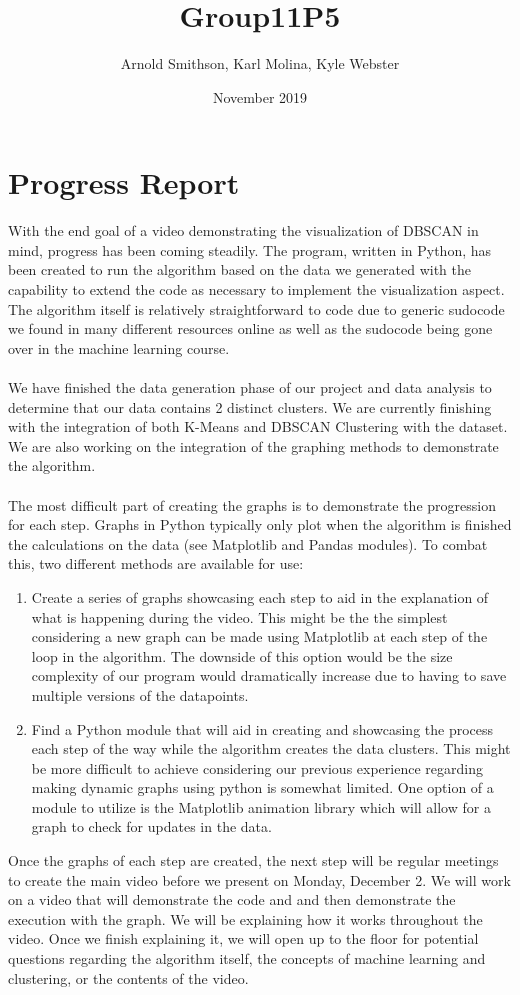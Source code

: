 \documentclass{article}
\title{Group11P5}
\author{Arnold Smithson, Karl Molina, Kyle Webster }
\date{November 2019}
\begin{document}
\maketitle

\section{Progress Report}

With the end goal of a video demonstrating the visualization of DBSCAN in mind, progress has been coming steadily. The program, written in Python, has been created to run the algorithm based on the data we generated with the capability to extend the code as necessary to implement the visualization aspect. The algorithm itself is relatively straightforward to code due to generic sudocode we found in many different resources online as well as the sudocode being gone over in the machine learning course. \\ \\
We have finished the data generation phase of our project and data analysis to determine that our data contains 2 distinct clusters. We are currently finishing with the integration of both K-Means and DBSCAN Clustering with the dataset. We are also working on the integration of the graphing methods to demonstrate the algorithm.\\
\\
The most difficult part of creating the graphs is to demonstrate the progression for each step. Graphs in Python typically only plot when the algorithm is finished the calculations on the data (see Matplotlib and Pandas modules). To combat this, two different methods are available for use:

\begin{enumerate}
    \item Create a series of graphs showcasing each step to aid in the explanation of what is happening during the video. This might be the the simplest considering a new graph can be made using Matplotlib at each step of the loop in the algorithm. The downside of this option would be the size complexity of our program would dramatically increase due to having to save multiple versions of the datapoints.

    \item 
    Find a Python module that will aid in creating and showcasing the process each step of the way while the algorithm creates the data clusters. This might be more difficult to achieve considering our previous experience regarding making dynamic graphs using python is somewhat limited. One option of a module to utilize is the Matplotlib animation library which will allow for a graph to check for updates in the data.
\end{enumerate}
\noindent
Once the graphs of each step are created, the next step will be regular meetings to create the main video before we present on Monday, December 2. We will work on a video that will demonstrate the code and and then demonstrate the execution with the graph. We will be explaining how it works throughout the video. Once we finish explaining it, we will open up to the floor for potential questions regarding the algorithm itself, the concepts of machine learning and clustering, or the contents of the video.
\end{document}
